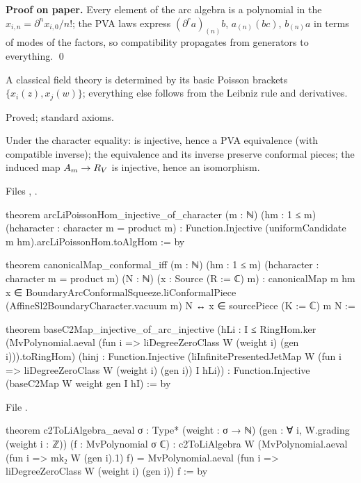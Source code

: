 \textbf{Proof on paper.} Every element of the arc algebra is a polynomial in the $x_{i,n}=\partial^nx_{i,0}/n!$; the PVA laws
express $(\partial^ra)_{(n)}b$, $a_{(n)}(bc)$, $b_{(n)}a$ in terms of modes of the factors, so compatibility propagates
from generators to everything. \qed

\begin{physics}
A classical field theory is determined by its basic Poisson brackets $\{x_i(z),x_j(w)\}$; everything else follows from the
Leibniz rule and derivatives.
\end{physics}

\begin{status}
Proved; standard axioms.
\end{status}

\begin{theorem}\label{l20:thm:m8}
Under the character equality:  is injective, hence a PVA equivalence (with compatible inverse);
the equivalence and its inverse preserve conformal pieces; the induced map $A_m\to R_V$ is injective, hence an
isomorphism.
\end{theorem}
\noindent Files ,
.
\begin{leancode}
theorem arcLiPoissonHom_injective_of_character (m : ℕ) (hm : 1 ≤ m)
    (hcharacter : character m = product m) :
    Function.Injective (uniformCandidate m hm).arcLiPoissonHom.toAlgHom := by

theorem canonicalMap_conformal_iff (m : ℕ) (hm : 1 ≤ m)
    (hcharacter : character m = product m) (N : ℕ) (x : Source (R := ℂ) m) :
    canonicalMap m hm x ∈ BoundaryArcConformalSqueeze.liConformalPiece
        (AffineSl2BoundaryCharacter.vacuum m) N ↔
      x ∈ sourcePiece (K := ℂ) m N :=

theorem baseC2Map_injective_of_arc_injective
    (hLi : I ≤ RingHom.ker (MvPolynomial.aeval
      (fun i => liDegreeZeroClass W (weight i) (gen i))).toRingHom)
    (hinj : Function.Injective (liInfinitePresentedJetMap W
      (fun i => liDegreeZeroClass W (weight i) (gen i)) I hLi)) :
    Function.Injective (baseC2Map W weight gen I hI) := by
\end{leancode}
\noindent File .
\begin{leancode}
theorem c2ToLiAlgebra_aeval {σ : Type*} (weight : σ → ℕ)
    (gen : ∀ i, W.grading (weight i : ℤ)) (f : MvPolynomial σ ℂ) :
    c2ToLiAlgebra W (MvPolynomial.aeval (fun i => mk₂ W (gen i).1) f) =
      MvPolynomial.aeval (fun i => liDegreeZeroClass W (weight i) (gen i)) f := by
\end{leancode}

